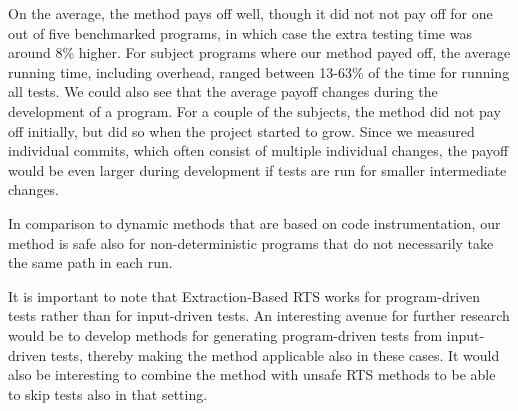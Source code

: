 {%

 
On the average, the method pays off well, though it did not not pay off for one
out of five benchmarked programs, in which case the extra testing time was
around 8\% higher. For subject programs where our method payed off, the
average running time, including overhead, ranged between 13-63\% of the time
for running all tests.  We could also see that the average payoff changes
during the development of a program. For a couple of the subjects, the method
did not pay off initially, but did so when the project started to grow. Since
we measured individual commits, which often consist of multiple individual
changes, the payoff would be even larger during development if tests are run
for smaller intermediate changes.


In comparison to dynamic methods that are based on code instrumentation, our method is safe also for non-deterministic programs that do not necessarily take the same path in each run.




It is important to note that Extraction-Based RTS works for program-driven tests rather than for input-driven tests. An interesting avenue for further research would be to develop methods for generating program-driven tests from input-driven tests, thereby making the method applicable also in these cases. It would also be interesting to combine the method with unsafe RTS methods to be able to skip tests also in that setting.

}

